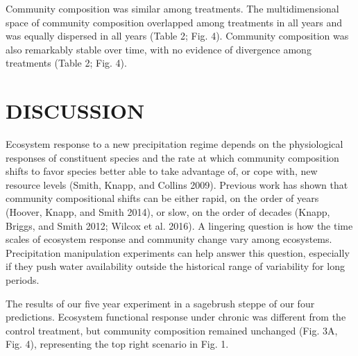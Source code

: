 \documentclass[fleqn,10pt,lineno]{wlpeerj} %
\begin{document}
Community composition was similar among treatments. The multidimensional
space of community composition overlapped among treatments in all years
and was equally dispersed in all years (Table 2; Fig. 4). Community
composition was also remarkably stable over time, with no evidence of
divergence among treatments (Table 2; Fig. 4).

\hypertarget{discussion}{%
\section{DISCUSSION}\label{discussion}}

Ecosystem response to a new precipitation regime depends on the
physiological responses of constituent species and the rate at which
community composition shifts to favor species better able to take
advantage of, or cope with, new resource levels (Smith, Knapp, and
Collins 2009). Previous work has shown that community compositional
shifts can be either rapid, on the order of years (Hoover, Knapp, and
Smith 2014), or slow, on the order of decades (Knapp, Briggs, and Smith
2012; Wilcox et al. 2016). A lingering question is how the time scales
of ecosystem response and community change vary among ecosystems.
Precipitation manipulation experiments can help answer this question,
especially if they push water availability outside the historical range
of variability for long periods.

The results of our five year experiment in a sagebrush steppe
 of our four predictions. Ecosystem functional
response under chronic  was different from the control
treatment, but community composition remained unchanged (Fig. 3A, Fig.
4), representing the top right scenario in Fig. 1.
\end{document}

